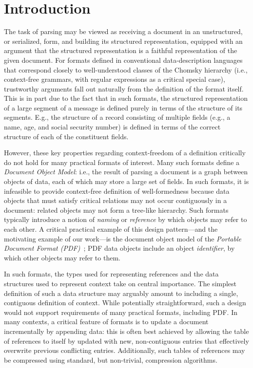 \section{Introduction }
\label{sec:intro}
The task of parsing may be viewed as receiving a document in an
unstructured, or serialized, form, and building its structured
representation, equipped with an argument that the structured
representation is a faithful representation of the given document.
%
For formats defined in conventional data-description languages that
correspond closely to well-understood classes of the Chomsky hierarchy
(i.e., context-free grammars, with regular expressions as a critical
special case), trustworthy arguments fall out naturally from the
definition of the format itself.
%
This is in part due to the fact that in such formats, the structured
representation of a large segment of a message is defined purely in
terms of the structure of its segments.
%
E.g., the structure of a record consisting of multiple fields (e.g., a
name, age, and social security number) is defined in terms of the
correct structure of each of the constituent fields.

However, these key properties regarding context-freedom of a
definition critically do not hold for many practical formats of
interest.
%
Many such formats define a \emph{Document Object Model}: i.e., the
result of parsing a document is a graph between objects of data, each
of which may store a large set of fields.
%
In such formats, it is infeasible to provide context-free definition
of well-formedness because data objects that must satisfy critical
relations may not occur contiguously in a document: related objects
may not form a tree-like hierarchy.
%
Such formats typically introduce a notion of \emph{naming} or
\emph{reference} by which objects may refer to each other.
%
A critical practical example of this design pattern---and the
motivating example of our work---is the document object model of the
\emph{Portable Document Format (PDF)}~\cite{isotc171sc2wg8ISO32000220202020};
%
PDF data objects include an object \emph{identifier}, by which other
objects may refer to them.

In such formats, the types used for representing references and the
data structures used to represent context take on central importance.
%
The simplest definition of such a data structure may arguably amount
to including a single, contiguous definition of context.
%
While potentially straightforward, such a design would not support
requirements of many practical formats, including PDF.
%
In many contexts, a critical feature of formats is to update a
document incrementally by appending data: this is often best achieved
by allowing the table of references to itself by updated with new,
non-contiguous entries that effectively overwrite previous conflicting
entries.
%
Additionally, such tables of references may be compressed using
standard, but non-trivial, compression algorithms.

